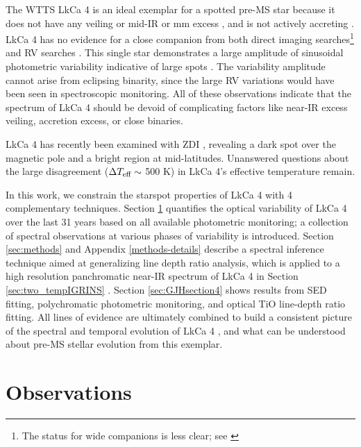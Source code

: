 \documentclass[twocolumn]{emulateapj}%
\newcommand{\name}{LkCa 4 }
\begin{document}
The WTTS \name \citep{herbig86,strom89a,downes88,strom89b} is an ideal exemplar for a spotted pre-MS star because it does not have any veiling \citep[\emph{e.g.}][]{hartigan95} or mid-IR or mm excess \citep[\emph{e.g.}][]{andrews05,furlan06,buckle15}, and is not actively accreting \citep[\emph{e.g.}][]{edwards06,cauley12}.  LkCa 4 has no evidence for a close companion from both direct imaging searches\citep{karr10,kraus11,daemgen15}\footnote{The status for wide companions is less clear; see \citet{stauffer91,itoh08,kraus09,kraus11,herczeg14}} and RV searches \citep{nguyen12,donati14}.  This single star demonstrates a large amplitude of sinusoidal photometric variability indicative of large spots \citep{grankin08,xiao12}.  The variability amplitude cannot arise from eclipsing binarity, since the large RV variations would have been seen in spectroscopic monitoring.  All of these observations indicate that the spectrum of \name should be devoid of complicating factors like near-IR excess veiling, accretion excess, or close binaries.    

LkCa 4 has recently been examined with ZDI \citep{donati14}, revealing a dark spot over the magnetic pole and a bright region at mid-latitudes.  Unanswered questions about the large disagreement ($\Delta T_\textrm{eff} \sim$ 500 K) in LkCa 4's effective temperature \citep{herczeg14, donati14} remain.

In this work, we constrain the starspot properties of \name with 4 complementary techniques.  Section \ref{sec:obs} quantifies the optical variability of \name over the last 31 years based on all available photometric monitoring; a collection of spectral observations at various phases of variability is introduced.  Section \ref{sec:methods} and Appendix \ref{methods-details} describe a spectral inference technique aimed at generalizing line depth ratio analysis, which is applied to a high resolution panchromatic near-IR spectrum of \name in Section \ref{sec:two_tempIGRINS} .  Section \ref{sec:GJHsection4} shows results from SED fitting, polychromatic photometric monitoring, and optical TiO line-depth ratio fitting.  All lines of evidence are ultimately combined to build a consistent picture of the spectral and temporal evolution of \name, and what can be understood about pre-MS stellar evolution from this exemplar.


\section{Observations}\label{sec:obs} 
\end{document}
